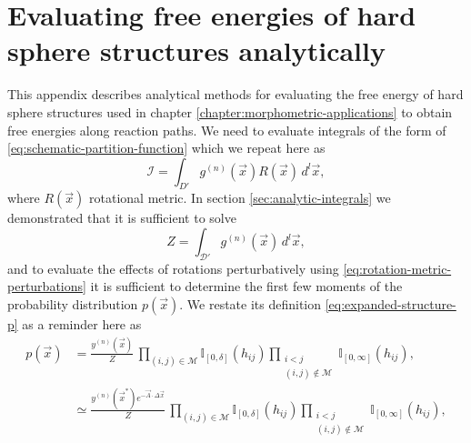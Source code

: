 \documentclass[11pt,twoside]{report}
\begin{document}
\chapter{Evaluating free energies of hard sphere structures analytically}
\label{appendix:bayesian}

This appendix describes analytical methods for evaluating the free energy of hard sphere structures used in chapter \ref{chapter:morphometric-applications} to obtain free energies along reaction paths.
We need to evaluate integrals of the form of \eqref{eq:schematic-partition-function} which we repeat here as
\begin{equation*}
  \mathcal{I}
  =
  \int_{D'}
  g^{(n)}(\vec{x}) R(\vec{x})
  \, d^l \vec{x},
\end{equation*}
where $R(\vec{x})$ rotational metric.
In section \eqref{sec:analytic-integrals} we demonstrated that it is sufficient to solve
\begin{equation*}
  Z = \int_{\mathcal{D}'} g^{(n)}(\vec{x}) \, d^l \vec{x},
\end{equation*}
and to evaluate the effects of rotations perturbatively using \eqref{eq:rotation-metric-perturbations} it is sufficient to determine the first few moments of the probability distribution $p(\vec{x})$.
We restate its definition \eqref{eq:expanded-structure-p} as a reminder here as
\begin{equation*}
  \begin{split}
    p(\vec{x})
    &=
    \frac{y^{(n)}(\vec{x})}{Z}
    \,
    \prod_{(i,j) \in \mathcal{M}} \mathbb{I}_{[0, \delta]}(h_{ij})
    \prod_{\substack{i < j \\ (i,j) \notin \mathcal{M}}}
    \mathbb{I}_{[0, \infty]} (h_{ij}),
    \\ &\simeq
    \frac{y^{(n)}(\vec{x}^*) e^{-\vec{A} \cdot \Delta \vec{x}}}{Z}
    \,
    \prod_{(i,j) \in \mathcal{M}} \mathbb{I}_{[0, \delta]}(h_{ij})
    \prod_{\substack{i < j \\ (i,j) \notin \mathcal{M}}}
    \mathbb{I}_{[0, \infty]} (h_{ij}),
  \end{split}
\end{equation*}
\end{document}
